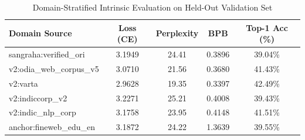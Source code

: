 \begin{table}[ht]
\centering
\caption{Domain-Stratified Intrinsic Evaluation on Held-Out Validation Set}
\begin{tabular}{lcccc}
\hline
\textbf{Domain Source} & \textbf{Loss (CE)} & \textbf{Perplexity} & \textbf{BPB} & \textbf{Top-1 Acc (\%)} \\
\hline
sangraha:verified\_ori & 3.1949 & 24.41 & 0.3896 & 39.04\% \\
v2:odia\_web\_corpus\_v5 & 3.0710 & 21.56 & 0.3680 & 41.43\% \\
v2:varta & 2.9628 & 19.35 & 0.3397 & 42.49\% \\
v2:indiccorp\_v2 & 3.2271 & 25.21 & 0.4008 & 39.43\% \\
v2:indic\_nlp\_corp & 3.1758 & 23.95 & 0.4148 & 41.51\% \\
anchor:fineweb\_edu\_en & 3.1872 & 24.22 & 1.3639 & 39.55\% \\
\hline
\end{tabular}
\end{table}

